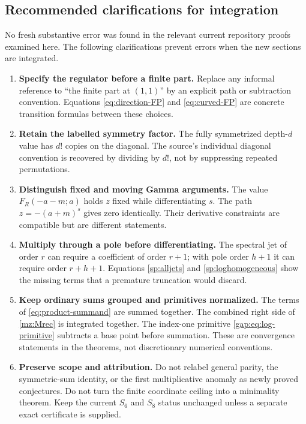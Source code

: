 \subsection{Recommended clarifications for integration}

No fresh substantive error was found in the relevant current repository
proofs examined here. The following clarifications prevent errors when
the new sections are integrated.

\begin{enumerate}[leftmargin=*,itemsep=4pt]
\item \textbf{Specify the regulator before a finite part.}
Replace any informal reference to ``the finite part at $(1,1)$'' by an
explicit path or subtraction convention. Equations
\eqref{eq:direction-FP} and \eqref{eq:curved-FP} are concrete transition
formulas between these choices.
\item \textbf{Retain the labelled symmetry factor.}
The fully symmetrized depth-$d$ value has $d!$ copies on the diagonal.
The source's individual diagonal convention is recovered by dividing by
$d!$, not by suppressing repeated permutations.
\item \textbf{Distinguish fixed and moving Gamma arguments.}
The value $F_R(-a-m;a)$ holds $z$ fixed while differentiating $s$.
The path $z=-(a+m)^s$ gives zero identically. Their derivative constraints
are compatible but are different statements.
\item \textbf{Multiply through a pole before differentiating.}
The spectral jet of order $r$ can require a coefficient of order $r+1$;
with pole order $h+1$ it can require order $r+h+1$. Equations
\eqref{sp:alljets} and \eqref{sp:loghomogeneous} show the missing terms
that a premature truncation would discard.
\item \textbf{Keep ordinary sums grouped and primitives normalized.}
The terms of \eqref{eq:product-summand} are summed together.
The combined right side of \eqref{mz:Mrec} is integrated together.
The index-one primitive \eqref{gap:eq:log-primitive} subtracts a base
point before summation. These are convergence statements in the
theorems, not discretionary numerical conventions.
\item \textbf{Preserve scope and attribution.}
Do not relabel general parity, the symmetric-sum identity, or the first
multiplicative anomaly as newly proved conjectures. Do not turn the
finite coordinate ceiling into a minimality theorem. Keep the current
$S_6$ and $S_8$ status unchanged unless a separate exact certificate is
supplied.
\end{enumerate}

